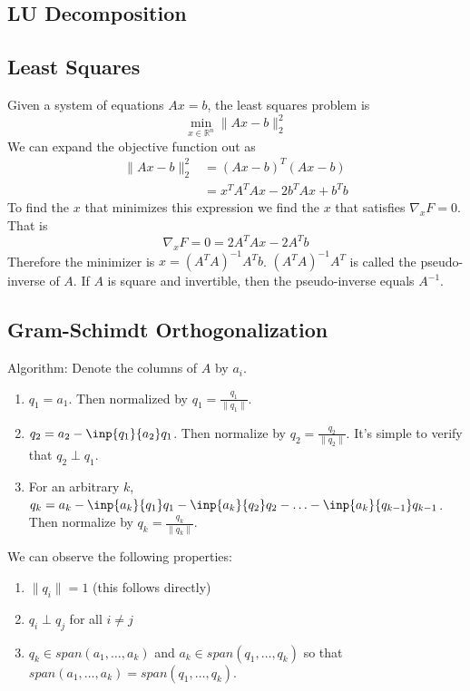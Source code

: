 \documentclass[12pt]{article}
\theoremstyle{definition}
\newcommand{\R}{\mathbb{R}}
\newcommand{\norm}[1]{\lVert#1\rVert}
\theoremstyle{definition}
\begin{document}
\subsection{LU Decomposition}

\subsection{Least Squares}
Given a system of equations $Ax = b$, the least squares problem is
\begin{equation}
	\min_{x \in \R^n} \norm{Ax - b}^2_2 
\end{equation}
We can expand the objective function out as
\begin{align*}
	\norm{Ax - b}^2_2 &= (Ax - b)^T (Ax - b) \\
	&= x^T A^T A x - 2 b^T A x + b^T b 
\end{align*}
To find the $x$ that minimizes this expression we find the $x$ that satisfies $\nabla_x F = 0$. That is
\begin{equation}
	\nabla_x F = 0 = 2 A^T A x - 2 A^T b
\end{equation}
Therefore the minimizer is $x = (A^T A)^{-1} A^T b$. $(A^T A)^{-1} A^T$ is called the pseudo-inverse of $A$. If $A$ is square and invertible, then the pseudo-inverse equals $A^{-1}$.

\subsection{Gram-Schimdt Orthogonalization}
Algorithm: Denote the columns of $A$ by $a_i$. 
\begin{enumerate}
	\item $q_1 = a_1$. Then normalized by $q_1 = \frac{q_1}{\norm{q_1}}$.
	\item $q_2 = a_2 - \inp{q_1}{a_2}q_1$. Then normalize by $q_2 = \frac{q_2}{\norm{q_2}}$. It's simple to verify that $q_2 \perp q_1$. 
	\item For an arbitrary $k$, $q_k = a_k - \inp{a_k}{q_1}q_1 - \inp{a_k}{q_2}q_2 - \ldots - \inp{a_k}{q_{k-1}}q_{k-1}$. Then normalize by $q_k = \frac{q_k}{\norm{q_k}}$.
\end{enumerate}

We can observe the following properties:
\begin{enumerate}
	\item $\norm{q_i} = 1$ (this follows directly)
	\item $q_i \perp q_j$ for all $i \neq j$
	\item $q_k \in span(a_1, \ldots, a_k)$ and $a_k \in span(q_1, \ldots, q_k)$ so that $span(a_1, \ldots, a_k) = span(q_1, \ldots, q_k)$.
\end{enumerate}
\end{document}
